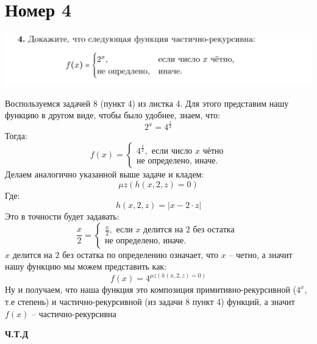 \documentclass[a4paper,12pt]{article}
\begin{document}
\section*{Номер 4}
\begin{center}
\includegraphics[scale=0.4]{4.png}
\end{center}
Воспользуемся задачей 8 (пункт 4) из листка 4. Для этого представим нашу функцию в другом виде, чтобы было удобнее, знаем, что:
\[
2^x = 4^{\frac{x}{2}}
\]
Тогда:
\[
f(x) = 
\begin{cases}
4^{\frac{x}{2}}, \text{ если число } x \text{ чётно} \\
\text{не определено, иначе.}
\end{cases}
\]
Делаем аналогично указанной выше задаче и кладем:
\[
\mu z \left(
h(x, 2, z) = 0
\right)
\]
Где:
\[
h(x, 2, z) = |x - 2 \cdot z| 
\]
Это в точности будет задавать:
\[
\frac{x}{2} = 
\begin{cases}
\frac{x}{2}, \text{ если } x \text{ делится на } 2 \text{ без остатка } \\
\text{не определено, иначе.} 
\end{cases}
\]
$x$ делится на $2$ без остатка по определению означает, что $x$ -- четно, а значит нашу функцию мы можем представить как:
\[
f(x) = 4^{\mu z \left(
h(x, 2, z) = 0
\right)}
\]
Ну и получаем, что наша функция это композиция примитивно-рекурсивной ($4^x$, т.е степень) и частично-рекурсивной (из задачи 8 пункт 4) функций, а значит $f(x)$ -- частично-рекурсивна
\begin{center}
\textbf{Ч.Т.Д} 
\end{center}
\end{document}
